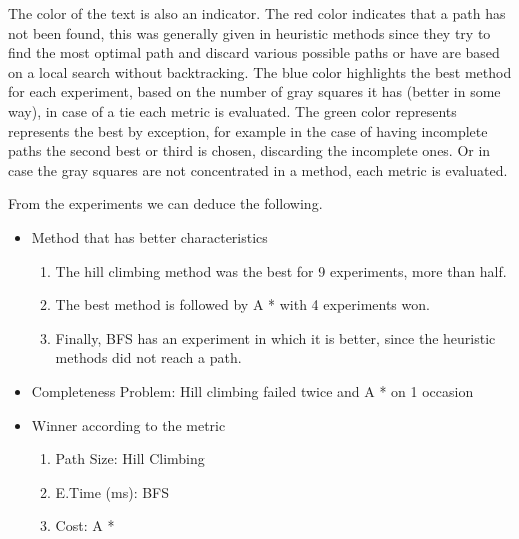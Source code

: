 \documentclass[11pt]{article}
\begin{document}
The color of the text is also an indicator. The red color indicates that a path has not been found, this was generally given in heuristic methods since they try to find the most optimal path and discard various possible paths or have are based on a local search without backtracking.
The blue color highlights the best method for each experiment, based on the number of gray squares it has (better in some way), in case of a tie each metric is evaluated.
The green color represents represents the best by exception, for example in the case of having incomplete paths the second best or third is chosen, discarding the incomplete ones. Or in case the gray squares are not concentrated in a method, each metric is evaluated.

From the experiments we can deduce the following.
\begin{itemize}
    \item Method that has better characteristics
    \begin{enumerate}
    \item The hill climbing method was the best for 9 experiments, more than half.
    \item The best method is followed by A * with 4 experiments won.
    \item Finally, BFS has an experiment in which it is better, since the heuristic methods did not reach a path.
    \end{enumerate}
    \item{Completeness Problem: }Hill climbing failed twice and A * on 1 occasion
    \item{Winner according to the metric}
    \begin{enumerate}
        \item Path Size: Hill Climbing
        \item E.Time (ms): BFS
        \item Cost: A *
    \end{enumerate}
\end{itemize}
\end{document}
